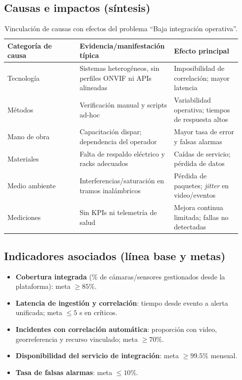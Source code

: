 \documentclass[12pt,a4paper]{article}
\begin{document}
\subsection*{Causas e impactos (síntesis)}
\begin{table}[htbp]
\centering
\caption{Vinculación de causas con efectos del problema “Baja integración operativa”.}
\begin{tabular}{p{0.30\linewidth} p{0.36\linewidth} p{0.28\linewidth}}
\hline
\textbf{Categoría de causa} & \textbf{Evidencia/manifestación típica} & \textbf{Efecto principal} \\
\hline
Tecnología & Sistemas heterogéneos, sin perfiles ONVIF ni APIs alineadas & Imposibilidad de correlación; mayor latencia \\
Métodos & Verificación manual y scripts ad-hoc & Variabilidad operativa; tiempos de respuesta altos \\
Mano de obra & Capacitación dispar; dependencia del operador & Mayor tasa de error y falsas alarmas \\
Materiales & Falta de respaldo eléctrico y racks adecuados & Caídas de servicio; pérdida de datos \\
Medio ambiente & Interferencias/saturación en tramos inalámbricos & Pérdida de paquetes; \textit{jitter} en video/eventos \\
Mediciones & Sin KPIs ni telemetría de salud & Mejora continua limitada; fallas no detectadas \\
\hline
\end{tabular}
\end{table}

\subsection*{Indicadores asociados (línea base y metas)}
\begin{itemize}
    \item \textbf{Cobertura integrada} (\% de cámaras/sensores gestionados desde la plataforma): meta \(\geq 85\%\).
    \item \textbf{Latencia de ingestión y correlación}: tiempo desde evento a alerta unificada; meta \(\leq 5\) s en críticos.
    \item \textbf{Incidentes con correlación automática}: proporción con video, georreferencia y recurso vinculado; meta \(\geq 70\%\).
    \item \textbf{Disponibilidad del servicio de integración}: meta \(\geq 99.5\%\) mensual.
    \item \textbf{Tasa de falsas alarmas}: meta \(\leq 10\%\).
\end{itemize}
\end{document}
